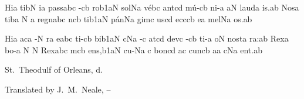 \bigskip

\nosolesmescustos
\initiumgregorianum
{}%
\sgn Hi{}\punctum a\egn
\spatium
\sgn t{i}b\punctum N\egn
\sgn {}i{}\punctum a\egn
\spatium
\sgn pa{ss}\punctum a\nonspatium\quilismapes bc\egn
{}-\clivis cb\egn
\sgn ro{}\episem b1\clivis aN\egn
\spatium
\divisiominima
\spatium
\sgn sol\pes Na\egn
\sgn v{\'e}b\punctum c\egn
\sgn {}a{nt}\pes cd\egn
\spatium
\sgn m{\'u}-\clivis cb\egn
\sgn ni-\punctum a\egn
\sgn {}a{}\punctum N\egn
\spatium
\sgn l{au}d\punctum a\egn
\sgn {}i{s.}\punctum a\augmentum b\egn
\spatium
\divisiomaior
\spatium
\sgn Nos\punctum a\egn
\spatium
\sgn t{i}b\punctum a\egn
{}\punctum N\egn
\spatium
\custos a
\lineaproxima
\sgn re{gn}\punctum a\nonspatium\quilismapes bc\egn
{}n\clivis cb\egn
\sgn ti{}\episem b1\clivis aN\egn
\spatium
\divisiominima
\spatium
\sgn p{\'a}n\pes Na\egn
\sgn gim\punctum c\egn
\sgn {}us\pes cd\egn
\spatium
\sgn {}e{cc}\clivis cb\egn
\sgn {}e{}\punctum a\egn
\spatium
\sgn m{e}l\pes Na\egn
\sgn {}o{s.}\punctum a\augmentum b\egn
\spatium
\Finisgregoriana

\bigskip

\nosolesmescustos
\initiumgregorianum
{}%
\sgn Hi{}\punctum a\egn
\spatium
{}a{c}\punctum a\egn
{}-\punctum N\egn
{}r\punctum a\egn
\sgn {}e{}\punctum a\nonspatium\quilismapes bc\egn
\spatium
\sgn t{i}{-}\clivis cb\egn
\sgn bi{}\episem b1\clivis aN\egn
\spatium
\divisiominima
\spatium
c\pes Na\egn
{}-\punctum c\egn
\sgn {}a{t}\pes cd\egn
\spatium
\sgn dev\punctum c\egn
{}-\clivis cb\egn
\sgn ti-\punctum a\egn
\sgn {}o{}\punctum N\egn
\spatium
\sgn n{o}{st}\punctum a\egn
\sgn ra:\punctum a\augmentum b\egn
\spatium
\divisiomaior
\spatium
\sgn Rex\punctum a\egn
\spatium
\sgn b{o}-\punctum a\egn
\custos N
\lineaproxima
{}\punctum N\egn
\spatium
\sgn Rex\punctum a\nonspatium\quilismapes bc\egn
\spatium
{}m\clivis cb\egn
\sgn {}e{ns,}\episem b1\clivis aN\egn
\spatium
\divisiominima
\spatium
\sgn cu-\pes Na\egn
{}\punctum c\egn
\spatium
\sgn b{o}n\pes cd\egn
\sgn {}a{}\punctum c\egn
\spatium
\sgn c{u}n\cephalicus cb\egn
{}a{}\punctum a\egn
\spatium
{}c\pes Na\egn
\sgn {}e{nt.}\punctum a\augmentum b\egn
\spatium
\Finisgregoriana


\bigskip

\source St.~Theodulf of Orleans, d.~

\source Translated by J.~M.~Neale, {}--

